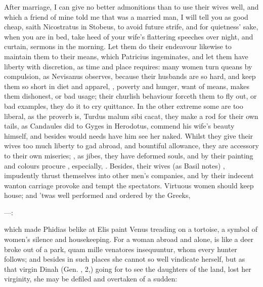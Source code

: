 After marriage, I can give no better admonitions than to use their
wives well, and which a friend of mine told me that was a married man,
I will tell you as good cheap, saith Nicostratus in Stobeus, to
avoid future strife, and for quietness' sake, when you are in bed, take
heed of your wife's flattering speeches over night, and curtain,
sermons in the morning. Let them do their endeavour likewise to
maintain them to their means, which Patricius ingeminates, and
let them have liberty with discretion, as time and place requires: many
women turn queans by compulsion, as Nevisanus observes, because
their husbands are so hard, and keep them so short in diet and apparel,
, poverty and hunger, want of means,
makes them dishonest, or bad usage; their churlish behaviour forceth
them to fly out, or bad examples, they do it to cry quittance. In the
other extreme some are too liberal, as the proverb is, Turdus malum
sibi cacat, they make a rod for their own tails, as Candaules did to
Gyges in Herodotus, commend his wife's beauty himself, and
besides would needs have him see her naked. Whilst they give their
wives too much liberty to gad abroad, and bountiful allowance, they are
accessory to their own miseries; , as
\Plautus{} jibes, they have deformed souls, and by their painting and
colours procure , especially, . Besides,
their wives (as Basil notes) , impudently
thrust themselves into other men's companies, and by their indecent wanton
carriage provoke and tempt the spectators. Virtuous women should keep house;
and 'twas well performed and ordered by the Greeks,

---:

which made Phidias belike at Elis paint Venus treading on a tortoise, a
symbol of women's silence and housekeeping. For a woman abroad and
alone, is like a deer broke out of a park, quam mille venatores
insequuntur, whom every hunter follows; and besides in such places she
cannot so well vindicate herself, but as that virgin Dinah (Gen.
, 2,) going for to see the daughters of the land, lost her
virginity, she may be defiled and overtaken of a sudden: 

